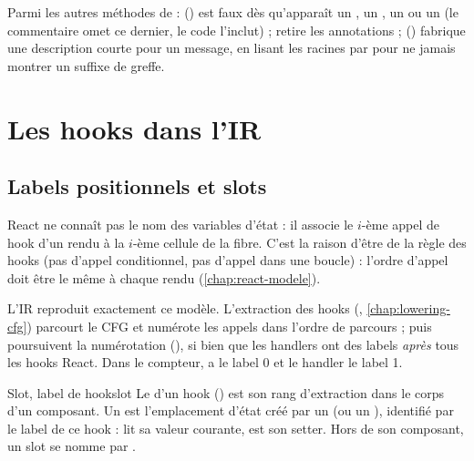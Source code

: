 Parmi les autres méthodes de  :  () est faux dès qu'apparaît un , un , un  ou un  (le commentaire omet ce dernier, le code l'inclut) ;  retire les annotations ;  () fabrique une description courte pour un message, en lisant les racines par  pour ne jamais montrer un suffixe de greffe.

\section{Les hooks dans l'IR}
\label{sec:ir-hooks}

\subsection{Labels positionnels et slots}

\begin{react}
React ne connaît pas le nom des variables d'état : il associe le $i$-ème appel de hook d'un rendu à la $i$-ème cellule de la fibre. C'est la raison d'être de la règle des hooks (pas d'appel conditionnel, pas d'appel dans une boucle) : l'ordre d'appel doit être le même à chaque rendu (\cref{chap:react-modele}).
\end{react}

L'IR reproduit exactement ce modèle. L'extraction des hooks (, \cref{chap:lowering-cfg}) parcourt le CFG et numérote les appels dans l'ordre de parcours ;  puis  poursuivent la numérotation (), si bien que les handlers ont des labels \emph{après} tous les hooks React. Dans le compteur,  a le label 0 et le handler le label 1.

\begin{definition}{Slot, label de hook}{slot}
Le  d'un hook () est son rang d'extraction dans le corps d'un composant. Un  est l'emplacement d'état créé par un  (ou un ), identifié par le label de ce hook :  lit sa valeur courante,  est son setter. Hors de son composant, un slot se nomme par .
\end{definition}

